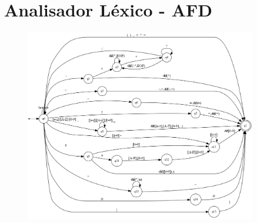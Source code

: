 \section{\esp Analisador Léxico - AFD}   
\begin{figure}[!ht]
	\vspace{0.2cm}
	\includegraphics[width=0.9\textwidth]{figuras/automato.png}
	 \vspace{0.2cm}
	\label{fig:figura1}
\end{figure}
\vspace{0.2cm}